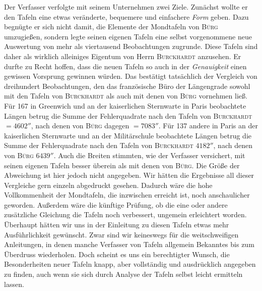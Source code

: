Der Verfasser verfolgte mit seinem Unternehmen zwei Ziele. Zunächst wollte er den Tafeln eine etwas veränderte, bequemere und einfachere \emph{Form} geben. Dazu begnügte er sich nicht damit, die Elemente der Mondtafeln von \textsc{Bürg} umzugießen, sondern legte seinen eigenen Tafeln eine selbst vorgenommene neue Auswertung von mehr als viertausend Beobachtungen zugrunde. Diese Tafeln sind daher als wirklich alleiniges Eigentum von Herrn \textsc{Burckhardt} anzusehen. Er durfte zu Recht hoffen, dass die neuen Tafeln so auch in der \emph{Genauigkeit} einen gewissen Vorsprung gewinnen würden. Das bestätigt tatsächlich der Vergleich von dreihundert Beobachtungen, den das französische Büro der Längengrade sowohl mit den Tafeln von \textsc{Burckhardt} als auch mit denen von \textsc{Bürg} vornehmen ließ. Für 167 in Greenwich und an der kaiserlichen Sternwarte in Paris beobachtete Längen betrug die Summe der Fehlerquadrate nach den Tafeln von \textsc{Burckhardt} $= 4602''$, nach denen von \textsc{Bürg} dagegen $= 7083''$. Für 137 andere in Paris an der kaiserlichen Sternwarte und an der Militärschule beobachtete Längen betrug die Summe der Fehlerquadrate nach den Tafeln von \textsc{Burckhardt} $4182''$, nach denen von \textsc{Bürg} $6439''$. Auch die Breiten stimmten, wie der Verfasser versichert, mit seinen eigenen Tafeln besser überein als mit denen von \textsc{Bürg}. Die Größe der Abweichung ist hier jedoch nicht angegeben. Wir hätten die Ergebnisse all dieser Vergleiche gern einzeln abgedruckt gesehen. Dadurch wäre die hohe Vollkommenheit der Mondtafeln, die inzwischen erreicht ist, noch anschaulicher geworden. Außerdem wäre die künftige Prüfung, ob die eine oder andere zusätzliche Gleichung die Tafeln noch verbessert, ungemein erleichtert worden. Überhaupt hätten wir uns in der Einleitung zu diesen Tafeln etwas mehr Ausführlichkeit gewünscht. Zwar sind wir keineswegs für die weitschweifigen Anleitungen, in denen manche Verfasser von Tafeln allgemein Bekanntes bis zum Überdruss wiederholen. Doch scheint es uns ein berechtigter Wunsch, die Besonderheiten neuer Tafeln knapp, aber vollständig und ausdrücklich angegeben zu finden, auch wenn sie sich durch Analyse der Tafeln selbst leicht ermitteln lassen.

